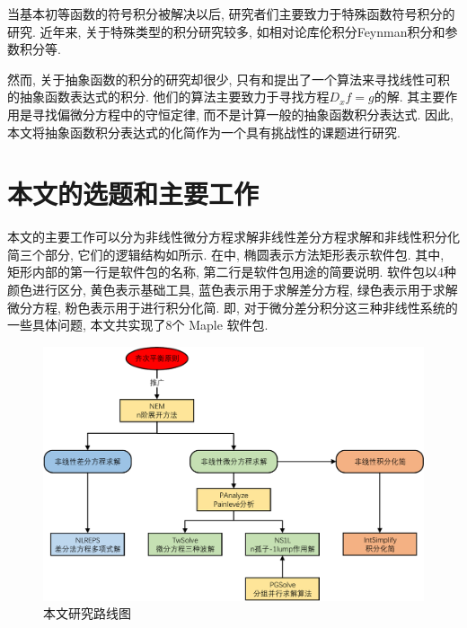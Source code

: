 当基本初等函数的符号积分被解决以后, 研究者们主要致力于特殊函数符号积分的研究\cite{cherry1985,cherry1986,bertrand1994,jeffrey1997}. 近年来, 关于特殊类型的积分研究较多, 如相对论库伦积分\cite{paule2012,paule2013}\D Feynman积分\cite{blumlein2012,smirnov2015}和参数积分\cite{raab2016}等.

然而, 关于抽象函数的积分的研究却很少, 只有和提出了一个算法来寻找线性可积的抽象函数表达式的积分. 他们的算法主要致力于寻找方程$D_x f=g$的解. 其主要作用是寻找偏微分方程中的守恒定律\cite{poole2011}, 而不是计算一般的抽象函数积分表达式. 因此, 本文将抽象函数积分表达式的化简作为一个具有挑战性的课题进行研究.

\section{本文的选题和主要工作}
本文的主要工作可以分为非线性微分方程求解\D 非线性差分方程求解和非线性积分化简三个部分, 它们的逻辑结构如所示. 在中, 椭圆表示方法\D 矩形表示软件包. 其中, 矩形内部的第一行是软件包的名称, 第二行是软件包用途的简要说明. 软件包以4种颜色进行区分, 黄色表示基础工具, 蓝色表示用于求解差分方程, 绿色表示用于求解微分方程, 粉色表示用于进行积分化简. 即, 对于微分\D 差分\D 积分这三种非线性系统的一些具体问题, 本文共实现了8个 Maple 软件包.

\begin{figure}[htbp]
\includegraphics[width=\textwidth]{fig/research.pdf}
\caption{本文研究路线图}
\end{figure}

